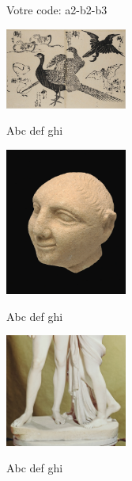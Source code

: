 \documentclass[a4paper,10pt]{article}
\begin{document}
  \par\noindent
  \parbox[t][20mm][c]{62mm}{
    \centering
    \par\noindent Votre code: a2-b2-b3
  }
  \vspace{3mm}
  \par\noindent
  \parbox[t][50mm][c]{62mm}{
    \centering
    \par\noindent\includegraphics[width=40mm]{../public/images/a2.jpg}
    \par\noindent Abc def ghi
  }
  \vspace{3mm}
  \par\noindent
  \parbox[t][50mm][c]{62mm}{
    \centering
    \par\noindent\includegraphics[width=40mm]{../public/images/a3.jpg}
    \par\noindent Abc def ghi
  }
  \vspace{3mm}
  \par\noindent
  \parbox[t][50mm][c]{62mm}{
    \centering
    \par\noindent\includegraphics[width=40mm]{../public/images/a4.jpg}
    \par\noindent Abc def ghi
  }
\end{document}
